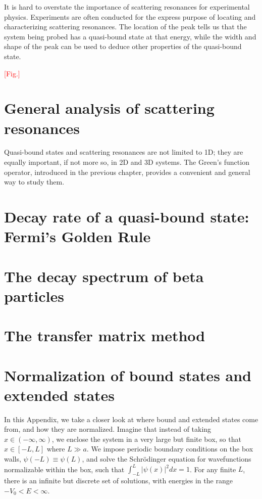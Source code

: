 \documentclass[pra,12pt]{revtex4}
\begin{document}
It is hard to overstate the importance of scattering resonances for
experimental physics.  Experiments are often conducted for the express
purpose of locating and characterizing scattering resonances.  The
location of the peak tells us that the system being probed has a
quasi-bound state at that energy, while the width and shape of the
peak can be used to deduce other properties of the quasi-bound state.


\textcolor{red}{[Fig.]}


\section{General analysis of scattering resonances}

Quasi-bound states and scattering resonances are not limited to 1D;
they are equally important, if not more so, in 2D and 3D systems.  The
Green's function operator, introduced in the previous chapter,
provides a convenient and general way to study them.



\section{Decay rate of a quasi-bound state: Fermi's Golden Rule}

\section{The decay spectrum of beta particles}


\appendix
\section{The transfer matrix method}
\label{sec:appendix}


\section{Normalization of bound states and extended states}
\label{sec:normalization}

In this Appendix, we take a closer look at where bound and extended
states come from, and how they are normalized.  Imagine that instead
of taking $x \in (-\infty,\infty)$, we enclose the system in a very
large but finite box, so that $x \in [-L,L]$ where $L \gg a$.  We
impose periodic boundary conditions on the box walls, $\psi(-L) \equiv
\psi(L)$, and solve the Schr\"odinger equation for wavefunctions
normalizable within the box, such that $\int_{-L}^{L} |\psi(x)|^2 dx =
1$.  For any finite $L$, there is an infinite but discrete set of
solutions, with energies in the range $-V_0 <E < \infty$.
\end{document}
